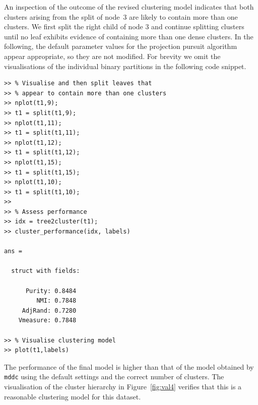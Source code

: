\documentclass{book}
\begin{document}
An inspection of the outcome of the revised clustering model indicates
that both clusters arising from the split of node~3 are likely to contain
more than one clusters. We first split the right child of node 3 and continue
splitting clusters until no leaf exhibits evidence of containing more than 
one dense clusters. In the following, the default parameter values for the
projection pursuit algorithm appear appropriate, so they are not modified.
%
For brevity we omit the visualisations of the individual binary partitions
in the following code snippet.

\begin{verbatim}
>> % Visualise and then split leaves that 
>> % appear to contain more than one clusters
>> nplot(t1,9);
>> t1 = split(t1,9);
>> nplot(t1,11);
>> t1 = split(t1,11);
>> nplot(t1,12);
>> t1 = split(t1,12);
>> nplot(t1,15);
>> t1 = split(t1,15);
>> nplot(t1,10);
>> t1 = split(t1,10);
>>
>> % Assess performance
>> idx = tree2cluster(t1);
>> cluster_performance(idx, labels)

ans = 

  struct with fields:

      Purity: 0.8484
         NMI: 0.7848
     AdjRand: 0.7280
    Vmeasure: 0.7848

>> % Visualise clustering model
>> plot(t1,labels)
\end{verbatim}


The performance of the final model is higher than that of the model obtained by
{\tt mddc} using the default settings and the correct number of clusters.
%
The visualisation of the cluster hierarchy in Figure~\ref{fig:val4}
verifies that this is a reasonable clustering model for this dataset.
\end{document}
